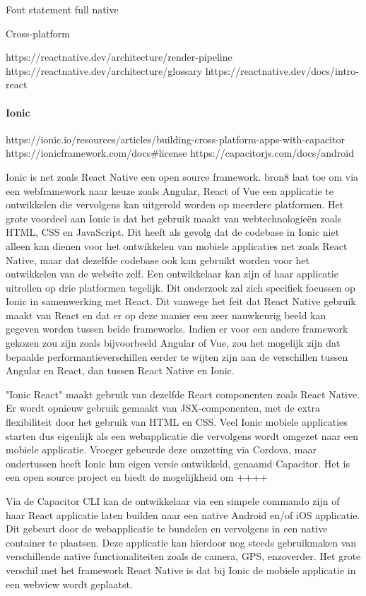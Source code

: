 Fout statement full native

Cross-platform

https://reactnative.dev/architecture/render-pipeline
https://reactnative.dev/architecture/glossary
https://reactnative.dev/docs/intro-react

\paragraph{Ionic}

https://ionic.io/resources/articles/building-cross-platform-apps-with-capacitor
https://ionicframework.com/docs#license
https://capacitorjs.com/docs/android

Ionic is net zoals React Native een open source framework. {bron8} laat toe om via een webframework naar keuze zoals Angular, React of Vue een applicatie te ontwikkelen die vervolgens kan uitgerold worden op meerdere platformen. Het grote voordeel aan Ionic is dat het gebruik maakt van webtechnologieën zoals HTML, CSS en JavaScript. Dit heeft als gevolg dat de codebase in Ionic niet alleen kan dienen voor het ontwikkelen van mobiele applicaties net zoals React Native, maar dat dezelfde codebase ook kan gebruikt worden voor het ontwikkelen van de website zelf. Een ontwikkelaar kan zijn of haar applicatie uitrollen op drie platformen tegelijk. Dit onderzoek zal zich specifiek focussen op Ionic in samenwerking met React. Dit vanwege het feit dat React Native gebruik maakt van React en dat er op deze manier een zeer nauwkeurig beeld kan gegeven worden tussen beide frameworks. Indien er voor een andere framework gekozen zou zijn zoals bijvoorbeeld Angular of Vue, zou het mogelijk zijn dat bepaalde performantieverschillen eerder te wijten zijn aan de verschillen tussen Angular en React, dan tussen React Native en Ionic.

"Ionic React" maakt gebruik van dezelfde React componenten zoals React Native. Er wordt opnieuw gebruik gemaakt van JSX-componenten, met de extra flexibiliteit door het gebruik van HTML en CSS. Veel Ionic mobiele applicaties starten dus eigenlijk als een webapplicatie die vervolgens wordt omgezet naar een mobiele applicatie. Vroeger gebeurde deze omzetting via Cordova, maar ondertussen heeft Ionic hun eigen versie ontwikkeld, genaamd Capacitor. Het is een open source project en biedt de mogelijkheid om ++++

Via de Capacitor CLI kan de ontwikkelaar via een simpele commando zijn of haar React applicatie laten builden naar een native Android en/of iOS applicatie. Dit gebeurt door de webapplicatie te bundelen en vervolgens in een native container te plaatsen. Deze applicatie kan hierdoor nog steeds gebruikmaken van verschillende native functionaliteiten zoals de camera, GPS, enzoverder. Het grote verschil met het framework React Native is dat bij Ionic de mobiele applicatie in een webview wordt geplaatst. 


